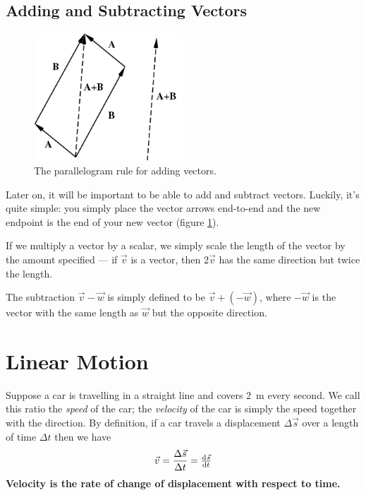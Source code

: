\documentclass[a4paper]{amsbook}
\newcommand\capcite[1]{}
\begin{document}
\subsection{Adding and Subtracting Vectors}
\begin{figure}
  \centering
  \includegraphics[width=0.5\textwidth]{parallelogram}
  \caption{The parallelogram rule for adding vectors. \capcite{http://mathworld.wolfram.com/images/eps-gif/ParallelogramLaw_1000.gif}\label{fig:parallelogram}}
\end{figure}
Later on, it will be important to be able to add and subtract vectors. Luckily, it's quite
simple: you simply place the vector arrows end-to-end and the new endpoint is the end of
your new vector (figure \ref{fig:parallelogram}).

If we multiply a vector by a scalar, we simply scale the length of the vector by the amount
specified --- if $ \vec v $ is a vector, then $ 2 \vec v $ has the same direction but twice the length.

The subtraction $ \vec v - \vec w $ is simply defined to be $ \vec v + (- \vec w) $, where $ - \vec w $ is the vector with
the same length as $ \vec w $ but the opposite direction.

\section{Linear Motion}
Suppose a car is travelling in a straight line and covers \SI{2}{\metre} every second. We call this
ratio the \textit{speed} of the car; the \textit{velocity} of the car is simply the speed together
with the direction. By definition, if a car travels a displacement $ \Delta \vec s $ over a length of time $ \Delta t $
then we have
\begin{equation}
  \vec v = \frac{\Delta \vec s}{\Delta t} = \od{\vec s}{t}
\end{equation}
\textbf{Velocity is the rate of change of displacement with respect to time.}
\end{document}
